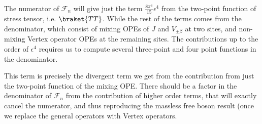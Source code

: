 \documentclass[11pt]{article}
\newcommand{\ep}{\epsilon}
\newcommand{\p}{\partial}
\begin{document}
The numerator of $\mathcal{F}_n$ will give just the term $\frac{8\pi^4}{15}\ep^4$ from the two-point function of stress tensor, i.e. $\braket{TT}$. While the rest of the terms comes from the denominator, which consist of mixing OPEs of $J$ and $V_{\pm \beta}$ at two sites, and non-mixing Vertex operator OPEs at the remaining sites. The contributions up to the order of $\ep^4$ requires us to compute several three-point and four point functions in the denominator. 

This term is precisely the divergent term we get from the contribution from just the two-point function of the mixing OPE. There should be a factor in the denominator of $\mathcal{F}_n$ from the contribution of higher order terms, that will exactly cancel the numerator, and thus reproducing the massless free boson result (once we replace the general operators with Vertex operators. 

\end{document}
